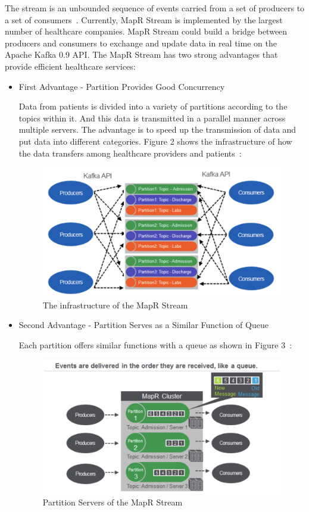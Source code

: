 The stream is an unbounded sequence of events 
carried from a set of producers to a set of consumers~\cite{stream}. 
Currently, MapR Stream 
is implemented by the largest number of healthcare 
companies. MapR 
Stream could build a bridge between producers and consumers 
to exchange and update data in real time on the 
Apache Kafka 0.9 API. 
The MapR Stream has 
two strong advantages that provide efficient healthcare services:

\begin{itemize}
	\item First Advantage - Partition Provides Good Concurrency
	
	Data from patients is divided into a variety of partitions according to the 
	topics within it. And this data is transmitted in a parallel 
	manner across multiple servers. 
	The advantage is to speed up the transmission of data and put data into 
	different categories. Figure 2 shows the infrastructure of how the 
	data transfers among healthcare providers and patients~\cite{stream}:
	
	\begin{figure}[!ht]
	\centering\includegraphics[width=\columnwidth]{images/mapr.png}
	\caption{The infrastructure of the MapR Stream}\label{f:mapr}
	\end{figure}
	
	\item Second Advantage - Partition Serves as a Similar 
	Function of Queue
	
Each partition offers similar functions with a queue as shown in  
Figure 3~\cite{stream}:

\begin{figure}[!ht]
	\centering\includegraphics[width=\columnwidth]{images/mapr2.png}
	\caption{Partition Servers of the MapR Stream}\label{f:mapr2}
	\end{figure}


\end{itemize}
